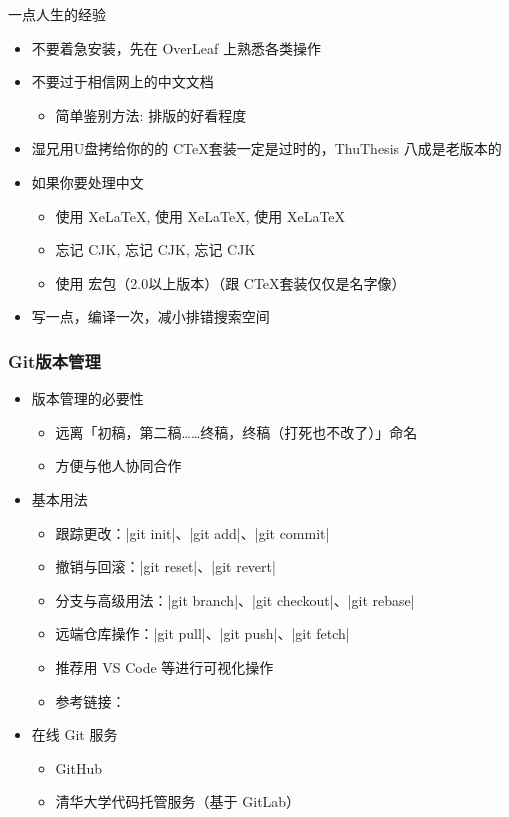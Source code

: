 \begin{frame}{一点人生的经验}
  \begin{itemize}
    \item 不要着急安装，先在 OverLeaf 上熟悉各类操作
    \item 不要过于相信网上的中文文档
      \begin{itemize}
        \item 简单鉴别方法: 排版的好看程度
      \end{itemize}
    \item 湿兄用U盘拷给你的的 C\TeX 套装一定是过时的，ThuThesis 八成是老版本的
    \item 如果你要处理中文
      \begin{itemize}
        \item 使用 XeLaTeX, 使用 XeLaTeX, 使用 XeLaTeX
        \item 忘记 CJK, 忘记 CJK, 忘记 CJK
        \item 使用  宏包（2.0以上版本）（跟 C\TeX 套装仅仅是名字像）
      \end{itemize}
    \item 写一点，编译一次，减小排错搜索空间
  \end{itemize}
\end{frame}

\begin{frame}[fragile]
  \frametitle{Git版本管理}
  \begin{itemize}
    \item 版本管理的必要性
      \begin{itemize}
        \item 远离「初稿，第二稿……终稿，终稿（打死也不改了）」命名
        \item 方便与他人协同合作
      \end{itemize}
    \item 基本用法
      \begin{itemize}
        \item 跟踪更改：|git init|、|git add|、|git commit|
        \item 撤销与回滚：|git reset|、|git revert|
        \item 分支与高级用法：|git branch|、|git checkout|、|git rebase|
        \item 远端仓库操作：|git pull|、|git push|、|git fetch|
        \item 推荐用 VS Code 等进行可视化操作
        \item 参考链接：
      \end{itemize}
    \item 在线 Git 服务
      \begin{itemize}
        \item GitHub \href{https://github.com}{\faGithub}
        \item 清华大学代码托管服务（基于 GitLab） 
      \end{itemize}
  \end{itemize}
  \end{frame}

